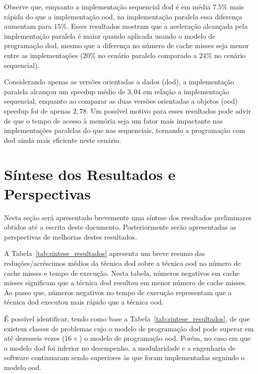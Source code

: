 Observe que, enquanto a implementação sequencial \ac{dod} é em média $ 7.5 \% $ mais rápida do que a implementação \ac{ood}, na implementação paralela essa diferença aumentam para $ 15 \% $.
Esses resultados mostram que a aceleração alcançada pela implementação paralela é maior quando aplicada usando o modelo de programação \ac{dod}, mesmo que a diferença no número de cache misses seja menor entre as implementações ($ 20 \% $ no cenário paralelo comparado a $ 24 \% $ no cenário sequencial).

Considerando apenas as versões orientadas a dados (\ac{dod}), a implementação paralela alcançou um speedup médio de $ 3,04 $ em relação a implementação sequencial, enquanto ao comparar as duas versões  orientadas a objetos (\ac{ood}) speedup foi de apenas $ 2,78 $.
Um possível motivo para esses resultados pode advir de que o tempo de acesso à memória seja um fator mais impactante nas implementações paralelas do que nas sequenciais, tornando a programação com \ac{dod} ainda mais eficiente neste cenário.


\section{Síntese dos Resultados e Perspectivas}
\label{sec:sintese_resultado}

Nesta seção será apresentado brevemente uma síntese dos resultados preliminares obtidos até a escrita deste documento. Posteriormente serão apresentadas as perspectivas de melhorias destes resultados.

A Tabela~\ref{tab:sintese_resultados} apresenta um breve resumo das reduções/acréscimos médios da técnica \ac{dod} sobre a técnica \ac{ood} no número de cache misses e tempo de execução.
Nesta tabela, números negativos em cache misses significam que a técnica \ac{dod} resultou em menor número de cache misses.
Ao passo que, números negativos no tempo de execução representam que a técnica \ac{dod} executou mais rápido que a técnica \ac{ood}.

É possível identificar, tendo como base a Tabela~\ref{tab:sintese_resultados}, de que existem classes de problemas cujo o modelo de programação \ac{dod} pode superar em até dezesseis vezes ($16 \times$) o modelo de programação \ac{ood}.
Porém, no caso em que o modelo \ac{dod} foi inferior no desempenho, a modularidade e a engenharia de software continuaram sendo superiores às que foram implementadas seguindo o modelo \ac{ood}.


